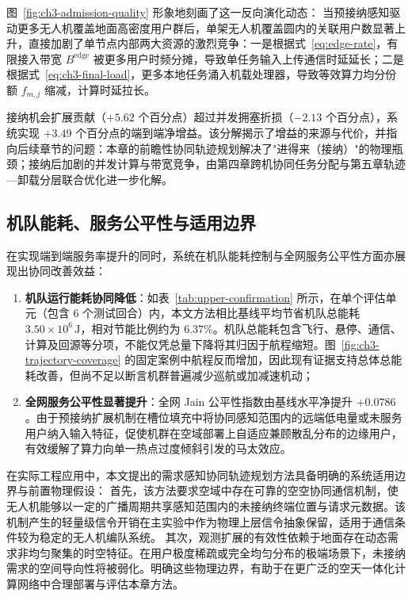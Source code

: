 图~\ref{fig:ch3-admission-quality} 形象地刻画了这一反向演化动态：
当预接纳感知驱动更多无人机覆盖地面高密度用户群后，单架无人机覆盖圆内的关联用户数显著上升，直接加剧了单节点内部两大资源的激烈竞争：一是根据式~\eqref{eq:edge-rate}，有限接入带宽 $B^{\mathrm{edge}}$ 被更多用户时频分摊，导致单任务输入上传通信时延延长；二是根据式~\eqref{eq:ch3-final-load}，更多本地任务涌入机载处理器，导致等效算力均分份额 $f_{m,j}$ 缩减，计算时延拉长。

接纳机会扩展贡献（$+5.62$ 个百分点）超过并发拥塞折损（$-2.13$ 个百分点），系统实现 $+3.49$ 个百分点的端到端净增益。该分解揭示了增益的来源与代价，并指向后续章节的问题：本章的前瞻性协同轨迹规划解决了"进得来（接纳）"的物理瓶颈；接纳后加剧的并发计算与带宽竞争，由第四章跨机协同任务分配与第五章轨迹—卸载分层联合优化进一步化解。

\subsection{机队能耗、服务公平性与适用边界}
\label{sec:ch3-non-claims}

在实现端到端服务率提升的同时，系统在机队能耗控制与全网服务公平性方面亦展现出协同改善效益：
\begin{enumerate}
    \item \textbf{机队运行能耗协同降低}：如表~\ref{tab:upper-confirmation} 所示，在单个评估单元（包含 6 个测试回合）内，本文方法相比基线平均节省机队总能耗 $3.50\times 10^6\,\mathrm{J}$，相对节能比例约为 $6.37\%$。机队总能耗包含飞行、悬停、通信、计算及回源等分项，不能仅凭总量下降将其归因于航程缩短。图~\ref{fig:ch3-trajectory-coverage} 的固定案例中航程反而增加，因此现有证据支持总体总能耗改善，但尚不足以断言机群普遍减少巡航或加减速机动；
    \item \textbf{全网服务公平性显著提升}：全网 Jain 公平性指数由基线水平净提升 $+0.0786$。由于预接纳扩展机制在槽位填充中将协同感知范围内的远端低电量或未服务用户纳入输入特征，促使机群在空域部署上自适应兼顾散乱分布的边缘用户，有效缓解了算力向单一热点过度倾斜引发的马太效应。
\end{enumerate}

在实际工程应用中，本文提出的需求感知协同轨迹规划方法具备明确的系统适用边界与前置物理假设：
首先，该方法要求空域中存在可靠的空空协同通信机制，使无人机能够以一定的广播周期共享感知范围内的未接纳终端位置与请求元数据。该机制产生的轻量级信令开销在主实验中作为物理上层信令抽象保留，适用于通信条件较为稳定的无人机编队系统。
其次，观测扩展的有效性依赖于地面存在动态需求非均匀聚集的时空特征。在用户极度稀疏或完全均匀分布的极端场景下，未接纳需求的空间导向性将被弱化。明确这些物理边界，有助于在更广泛的空天一体化计算网络中合理部署与评估本章方法。

